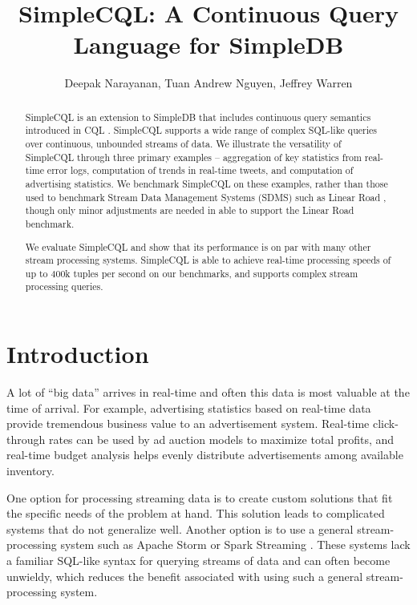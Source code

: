 \documentclass[a4paper, 10pt, conference]{IEEEconf}
\title{\LARGE \bf SimpleCQL: A Continuous Query Language for SimpleDB}
\author{Deepak Narayanan, Tuan Andrew Nguyen, Jeffrey Warren}
\begin{document}
\maketitle
\thispagestyle{empty}
\pagestyle{empty}


\begin{abstract}

SimpleCQL is an extension to SimpleDB \cite{simpledb} that includes continuous query semantics introduced in CQL \cite{cql}. SimpleCQL supports a wide range of complex SQL-like queries over continuous, unbounded streams of data.  We illustrate the versatility of SimpleCQL through three primary examples -- aggregation of key statistics from real-time error logs, computation of trends in real-time tweets, and computation of advertising statistics.  We benchmark SimpleCQL on these examples, rather than those used to benchmark Stream Data Management Systems (SDMS) such as Linear Road \cite{linear}, though only minor adjustments are needed in able to support the Linear Road benchmark.

We evaluate SimpleCQL and show that its performance is on par with many other stream processing systems.  SimpleCQL is able to achieve real-time processing speeds of up to 400k tuples per second on our benchmarks, and supports complex stream processing queries.

\end{abstract}


\section{Introduction}

A lot of ``big data'' arrives in real-time and often this data is most valuable at the time of arrival. For example, advertising statistics based on real-time data provide tremendous business value to an advertisement system.  Real-time click-through rates can be used by ad auction models to maximize total profits, and real-time budget analysis helps evenly distribute advertisements among available inventory.

One option for processing streaming data is to create custom solutions that fit the specific needs of the problem at hand.  This solution leads to complicated systems that do not generalize well.  Another option is to use a general stream-processing system such as Apache Storm \cite{storm} or Spark Streaming \cite{spark_streaming}.  These systems lack a familiar SQL-like syntax for querying streams of data and can often become unwieldy, which reduces the benefit associated with using such a general stream-processing system.
\end{document}
